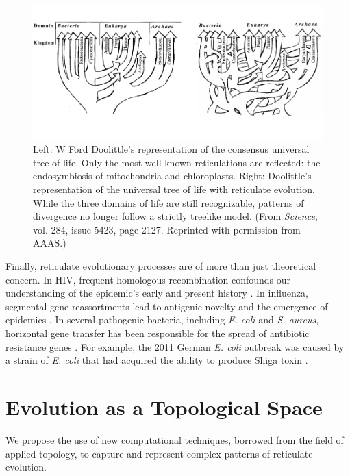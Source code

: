 \begin{figure}
\centering
\includegraphics[]{./fig/introduction/doolittle_trees.pdf}
\caption[Ford Doolittle's Reticulate Tree of Life]{Left: W Ford Doolittle's representation of the consensus universal tree of life. Only the most well known reticulations are reflected: the endosymbiosis of mitochondria and chloroplasts. Right: Doolittle's representation of the universal tree of life with reticulate evolution. While the three domains of life are still recognizable, patterns of divergence no longer follow a strictly treelike model. (From \emph{Science}, vol. 284, issue 5423, page 2127. Reprinted with permission from AAAS.)}
\label{fig:doolittle_tree}
\end{figure}

Finally, reticulate evolutionary processes are of more than just theoretical concern.
In HIV, frequent homologous recombination confounds our understanding of the epidemic's early and present history \cite{Burke:1997ep}.
In influenza, segmental gene reassortments lead to antigenic novelty and the emergence of epidemics \cite{Nelson:2007bc}.
In several pathogenic bacteria, including \emph{E. coli} and \emph{S. aureus}, horizontal gene transfer has been responsible for the spread of antibiotic resistance genes \cite{Alekshun:2007bq,Davies:2010dv}.
For example, the 2011 German \emph{E. coli} outbreak was caused by a strain of \emph{E. coli} that had acquired the ability to produce Shiga toxin \cite{Rohde:2011ju}.

\section{Evolution as a Topological Space}

We propose the use of new computational techniques, borrowed from the field of applied topology, to capture and represent complex patterns of reticulate evolution.

